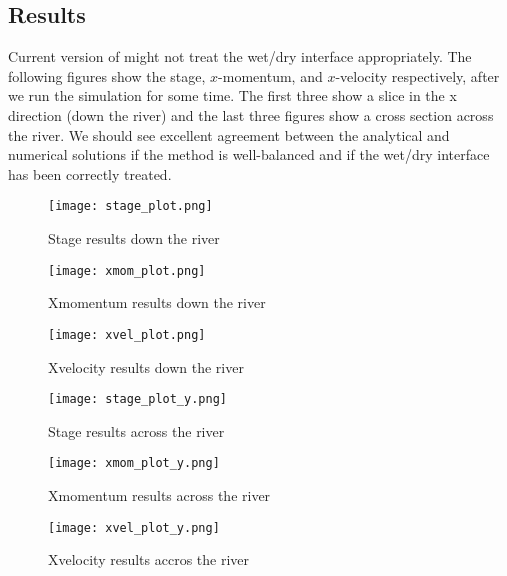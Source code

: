 \subsection{Results}


Current version of \anuga{} might not treat the wet/dry interface appropriately. 
The following figures show the stage, $x$-momentum, and $x$-velocity respectively, 
after we run the simulation for some time. The first three show a slice in the x direction (down the river) and 
the last three figures show a cross section across the river. We should see excellent agreement between 
the analytical and numerical solutions if the method is well-balanced and if the wet/dry 
interface has been correctly treated.

\begin{figure}
\begin{center}
\texttt{[image: stage\_plot.png]}
\end{center}
\caption{Stage results down the river}
\end{figure}


\begin{figure}
\begin{center}
\texttt{[image: xmom\_plot.png]}
\end{center}
\caption{Xmomentum results down the river}
\end{figure}


\begin{figure}
\begin{center}
\texttt{[image: xvel\_plot.png]}
\end{center}
\caption{Xvelocity results down the river}
\end{figure}

\begin{figure}
\begin{center}
\texttt{[image: stage\_plot\_y.png]}
\end{center}
\caption{Stage results across the river}
\end{figure}


\begin{figure}
\begin{center}
\texttt{[image: xmom\_plot\_y.png]}
\end{center}
\caption{Xmomentum results across the river}
\end{figure}


\begin{figure}
\begin{center}
\texttt{[image: xvel\_plot\_y.png]}
\end{center}
\caption{Xvelocity results accros the river}
\end{figure}

\endinput
